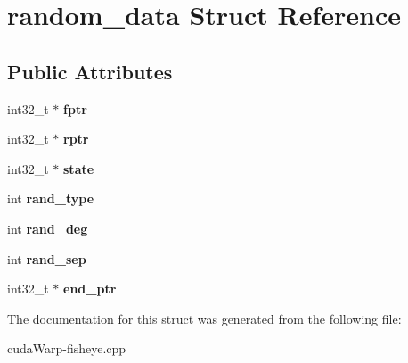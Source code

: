 \hypertarget{structrandom__data}{}\section{random\+\_\+data Struct Reference}
\label{structrandom__data}
\subsection*{Public Attributes}
\begin{DoxyCompactItemize}
\item 
int32\+\_\+t $\ast$ {\bfseries fptr}\hypertarget{structrandom__data_ae6e2af7f4e11437071b8f7cba68597ea}{}\label{structrandom__data_ae6e2af7f4e11437071b8f7cba68597ea}

\item 
int32\+\_\+t $\ast$ {\bfseries rptr}\hypertarget{structrandom__data_acb52fa4eb72dc856fc12cd95f494f7e3}{}\label{structrandom__data_acb52fa4eb72dc856fc12cd95f494f7e3}

\item 
int32\+\_\+t $\ast$ {\bfseries state}\hypertarget{structrandom__data_a4e61cd25a073feba4e7b3b7b408d3aca}{}\label{structrandom__data_a4e61cd25a073feba4e7b3b7b408d3aca}

\item 
int {\bfseries rand\+\_\+type}\hypertarget{structrandom__data_aa461e823ad2f86ee9fe874e748a24c38}{}\label{structrandom__data_aa461e823ad2f86ee9fe874e748a24c38}

\item 
int {\bfseries rand\+\_\+deg}\hypertarget{structrandom__data_a0119d1eb1140a9a0a18876f40727de8c}{}\label{structrandom__data_a0119d1eb1140a9a0a18876f40727de8c}

\item 
int {\bfseries rand\+\_\+sep}\hypertarget{structrandom__data_a9182e517545b2f5d6a5c8e488e027f9b}{}\label{structrandom__data_a9182e517545b2f5d6a5c8e488e027f9b}

\item 
int32\+\_\+t $\ast$ {\bfseries end\+\_\+ptr}\hypertarget{structrandom__data_a8d2d034703f2daee5cc1ebefd3ab8313}{}\label{structrandom__data_a8d2d034703f2daee5cc1ebefd3ab8313}

\end{DoxyCompactItemize}


The documentation for this struct was generated from the following file\+:\begin{DoxyCompactItemize}
\item 
cuda\+Warp-\/fisheye.\+cpp\end{DoxyCompactItemize}
